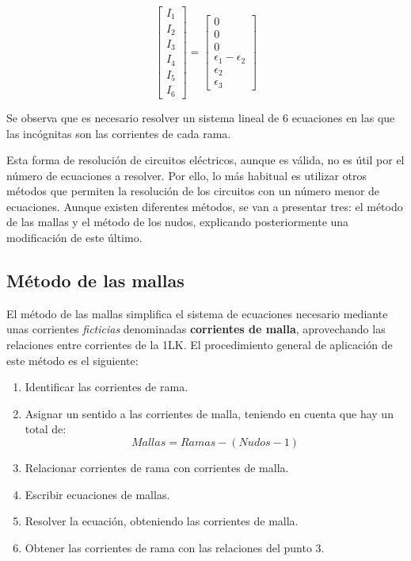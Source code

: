 \documentclass[11pt]{book} %
\begin{document}
\begin{example}
\begin{enumerate}
\begin{equation*}
				\begin{bmatrix}
					I_1\\
					I_2\\
					I_3\\
					I_4\\
					I_5\\
					I_6    
				\end{bmatrix} = %
				\begin{bmatrix}
					0\\
					0\\
					0\\
					\epsilon_1 - \epsilon_2\\
					\epsilon_2\\
					\epsilon_3
				\end{bmatrix}
			\end{equation*}
		\end{enumerate}
		Se observa que es necesario resolver un sistema lineal de 6 ecuaciones en las que las incógnitas son las corrientes de cada rama. 
	\end{example}
	
	Esta forma de resolución de circuitos eléctricos, aunque es válida, no es útil por el número de ecuaciones a resolver. Por ello, lo más habitual es utilizar otros métodos que permiten la resolución de los circuitos con un número menor de ecuaciones. Aunque existen diferentes métodos, se van a presentar tres: el método de las mallas y el método de los nudos, explicando posteriormente una modificación de este último.
	
	\subsection{Método de las mallas}
	El método de las mallas simplifica el sistema de ecuaciones necesario mediante unas corrientes \emph{ficticias} denominadas \textbf{corrientes de malla}, aprovechando las relaciones entre corrientes de la 1LK. El procedimiento general de aplicación de este método es el siguiente:
	\begin{enumerate}
		\item Identificar las corrientes de rama.
		\item Asignar un sentido a las corrientes de malla, teniendo en cuenta que hay un total de:
		\begin{equation*}
			{Mallas=Ramas-(Nudos-1)}
		\end{equation*}
		\item Relacionar corrientes de rama con corrientes de malla.
		\item Escribir ecuaciones de mallas.
		\item Resolver la ecuación, obteniendo las corrientes de malla.
		\item Obtener las corrientes de rama con las relaciones del punto 3.
	\end{enumerate}
	
\end{document}
